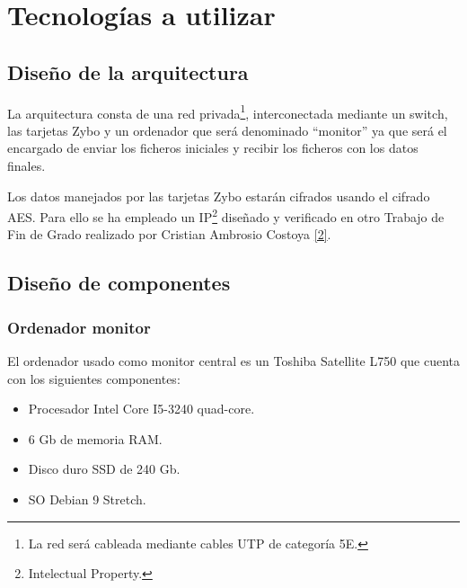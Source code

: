 \section{Tecnologías a utilizar}
\subsection{Diseño de la arquitectura}
La arquitectura consta de una red privada\footnote{La red será cableada mediante cables UTP de categoría 5E.}, interconectada mediante un switch, las tarjetas Zybo y un ordenador que será denominado ``monitor'' ya que será el encargado de enviar los ficheros iniciales y recibir los ficheros con los datos finales.

Los datos manejados por las tarjetas Zybo estarán cifrados usando el cifrado AES. Para ello se ha empleado un IP\footnote{Intelectual Property.} diseñado y verificado en otro Trabajo de Fin de Grado realizado por Cristian Ambrosio Costoya \hyperlink{2}{[2]}.

\subsection{Diseño de componentes}
\subsubsection{Ordenador monitor}
El ordenador usado como monitor central es un Toshiba Satellite L750 que cuenta con los siguientes componentes:
\begin{itemize}
	\item Procesador Intel Core I5-3240 quad-core.
	\item 6 Gb de memoria RAM.
	\item Disco duro SSD de 240 Gb.
	\item SO Debian 9 Stretch.
\end{itemize}

